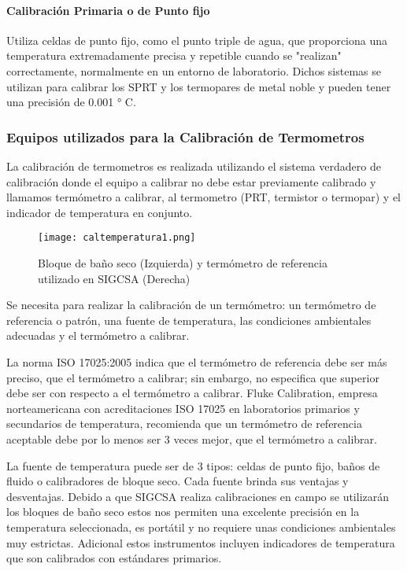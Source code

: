 \paragraph{Calibración Primaria o de Punto fijo} 
Utiliza celdas de punto fijo, como el punto triple de agua, que proporciona una temperatura extremadamente precisa y repetible cuando se "realizan" correctamente, normalmente en un entorno de laboratorio. Dichos sistemas se utilizan para calibrar los SPRT y los termopares de metal noble y pueden tener una precisión de 0.001 ° C.

\subsubsection{Equipos utilizados para la Calibración de Termometros}

\par 
La calibración de termometros es realizada utilizando el sistema verdadero de calibración donde el equipo a calibrar no debe estar previamente calibrado y llamamos termómetro a calibrar, al termometro (PRT, termistor o termopar) y el indicador de temperatura en conjunto.

\begin{figure}[H]
	\centering
	\texttt{[image: caltemperatura1.png]}
	\caption{Bloque de baño seco (Izquierda) y termómetro de referencia utilizado en SIGCSA (Derecha)}
\end{figure}

\par \noindent
Se necesita para realizar la calibración de un termómetro: un termómetro de referencia o patrón, una fuente de temperatura, las condiciones ambientales adecuadas y el termómetro a calibrar.

\par \noindent
La norma ISO 17025:2005 indica que el termómetro de referencia debe ser más preciso, que el termómetro a calibrar; sin embargo, no especifica que superior debe ser con respecto a el termómetro a calibrar. Fluke Calibration, empresa norteamericana con acreditaciones ISO 17025 en laboratorios primarios y secundarios de temperatura, recomienda que un termómetro de referencia aceptable debe por lo menos ser 3 veces mejor, que el termómetro a calibrar.



\par \noindent
La fuente de temperatura puede ser de 3 tipos: celdas de punto fijo, baños de fluido o calibradores de bloque seco.
Cada fuente brinda sus ventajas y desventajas. Debido a que SIGCSA realiza calibraciones en campo se utilizarán los bloques de baño seco estos nos permiten una excelente precisión en la temperatura seleccionada, es portátil y no requiere unas condiciones ambientales muy estrictas.
Adicional estos instrumentos incluyen indicadores de temperatura que son calibrados con estándares primarios.

